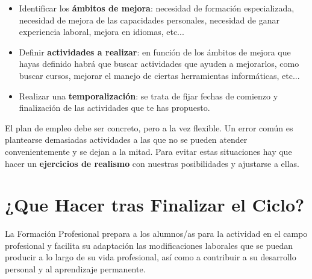 \begin{itemize}
    \item Identificar los \textbf{ámbitos de mejora}: necesidad de formación especializada, necesidad de mejora de las capacidades personales, necesidad de ganar experiencia laboral, mejora en idiomas, etc...
    \item Definir \textbf{actividades a realizar}: en función de los ámbitos de mejora que hayas definido habrá que buscar actividades que ayuden a mejorarlos, como buscar cursos, mejorar el manejo de ciertas herramientas informáticas, etc...
    \item Realizar una \textbf{temporalización}: se trata de fijar fechas de comienzo y finalización de las actividades que te has propuesto.
\end{itemize}

El plan de empleo debe ser concreto, pero a la vez flexible. Un error común es plantearse demasiadas actividades a las que no se pueden atender convenientemente y se dejan a la mitad. Para evitar estas situaciones hay que hacer un \textbf{ejercicios de realismo} con nuestras posibilidades y ajustarse a ellas.

\section{¿Que Hacer tras Finalizar el Ciclo?}
La Formación Profesional prepara a los alumnos/as para la actividad en el campo profesional y facilita su adaptación  las modificaciones laborales que se puedan producir a lo largo de su vida profesional, así como a contribuir a su desarrollo personal y al aprendizaje permanente.


\glsaddall
\printglossaries


\newpage
{}




